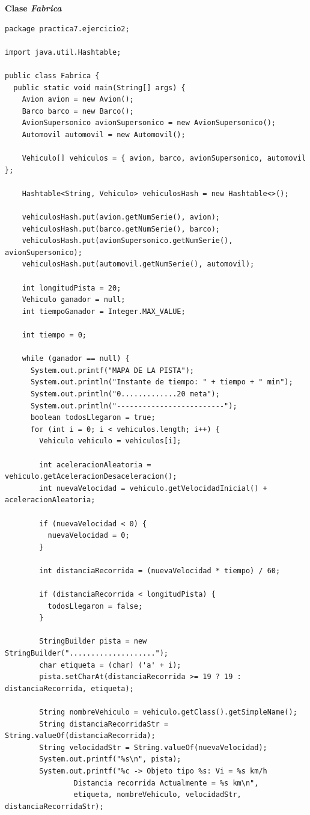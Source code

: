 \documentclass[11pt, twocolumn]{article}
\begin{document}
  \textbf{Clase \textit{Fabrica}}
  \begin{lstlisting}
package practica7.ejercicio2;

import java.util.Hashtable;

public class Fabrica {
  public static void main(String[] args) {
    Avion avion = new Avion();
    Barco barco = new Barco();
    AvionSupersonico avionSupersonico = new AvionSupersonico();
    Automovil automovil = new Automovil();

    Vehiculo[] vehiculos = { avion, barco, avionSupersonico, automovil };

    Hashtable<String, Vehiculo> vehiculosHash = new Hashtable<>();

    vehiculosHash.put(avion.getNumSerie(), avion);
    vehiculosHash.put(barco.getNumSerie(), barco);
    vehiculosHash.put(avionSupersonico.getNumSerie(), avionSupersonico);
    vehiculosHash.put(automovil.getNumSerie(), automovil);

    int longitudPista = 20;
    Vehiculo ganador = null;
    int tiempoGanador = Integer.MAX_VALUE;

    int tiempo = 0;

    while (ganador == null) {
      System.out.printf("MAPA DE LA PISTA");
      System.out.println("Instante de tiempo: " + tiempo + " min");
      System.out.println("0.............20 meta");
      System.out.println("-------------------------");
      boolean todosLlegaron = true;
      for (int i = 0; i < vehiculos.length; i++) {
        Vehiculo vehiculo = vehiculos[i];

        int aceleracionAleatoria = vehiculo.getAceleracionDesaceleracion(); 
        int nuevaVelocidad = vehiculo.getVelocidadInicial() + aceleracionAleatoria;

        if (nuevaVelocidad < 0) {
          nuevaVelocidad = 0;
        }

        int distanciaRecorrida = (nuevaVelocidad * tiempo) / 60; 

        if (distanciaRecorrida < longitudPista) {
          todosLlegaron = false;
        }

        StringBuilder pista = new StringBuilder("....................");
        char etiqueta = (char) ('a' + i);
        pista.setCharAt(distanciaRecorrida >= 19 ? 19 : distanciaRecorrida, etiqueta);

        String nombreVehiculo = vehiculo.getClass().getSimpleName();
        String distanciaRecorridaStr = String.valueOf(distanciaRecorrida);
        String velocidadStr = String.valueOf(nuevaVelocidad);
        System.out.printf("%s\n", pista);
        System.out.printf("%c -> Objeto tipo %s: Vi = %s km/h 
                Distancia recorrida Actualmente = %s km\n",
                etiqueta, nombreVehiculo, velocidadStr, distanciaRecorridaStr);


\end{lstlisting}
\end{document}
